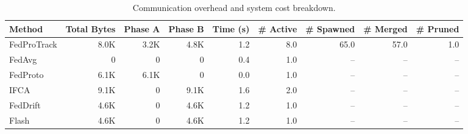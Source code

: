 \begin{table}[t]
\centering
\caption{Communication overhead and system cost breakdown.}
\label{tab:overhead}
\begin{tabular}{lrrrrrrrr}
\toprule
Method & Total Bytes & Phase A & Phase B & Time (s) & \# Active & \# Spawned & \# Merged & \# Pruned \\
\midrule
FedProTrack & 8.0K & 3.2K & 4.8K & 1.2 & 8.0 & 65.0 & 57.0 & 1.0 \\
FedAvg & 0 & 0 & 0 & 0.4 & 1.0 & -- & -- & -- \\
FedProto & 6.1K & 6.1K & 0 & 0.0 & 1.0 & -- & -- & -- \\
IFCA & 9.1K & 0 & 9.1K & 1.6 & 2.0 & -- & -- & -- \\
FedDrift & 4.6K & 0 & 4.6K & 1.2 & 1.0 & -- & -- & -- \\
Flash & 4.6K & 0 & 4.6K & 1.2 & 1.0 & -- & -- & -- \\
\bottomrule
\end{tabular}
\end{table}